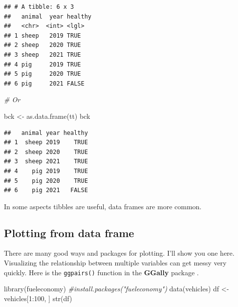 \documentclass[
]{book}
\newenvironment{Shaded}{\begin{snugshade}}{\end{snugshade}}
\newcommand{\CommentTok}[1]{\textcolor[rgb]{0.56,0.35,0.01}{\textit{#1}}}
\newcommand{\DecValTok}[1]{\textcolor[rgb]{0.00,0.00,0.81}{#1}}
\newcommand{\FunctionTok}[1]{\textcolor[rgb]{0.00,0.00,0.00}{#1}}
\newcommand{\NormalTok}[1]{#1}
\newcommand{\OtherTok}[1]{\textcolor[rgb]{0.56,0.35,0.01}{#1}}
\newcommand{\SpecialCharTok}[1]{\textcolor[rgb]{0.00,0.00,0.00}{#1}}
\begin{document}
\begin{verbatim}
## # A tibble: 6 x 3
##   animal  year healthy
##   <chr>  <int> <lgl>  
## 1 sheep   2019 TRUE   
## 2 sheep   2020 TRUE   
## 3 sheep   2021 TRUE   
## 4 pig     2019 TRUE   
## 5 pig     2020 TRUE   
## 6 pig     2021 FALSE
\end{verbatim}

\begin{Shaded}
\begin{Highlighting}[]
\CommentTok{\# Or}

\NormalTok{bck }\OtherTok{\textless{}{-}} \FunctionTok{as.data.frame}\NormalTok{(tt)}
\NormalTok{bck}
\end{Highlighting}
\end{Shaded}

\begin{verbatim}
##   animal year healthy
## 1  sheep 2019    TRUE
## 2  sheep 2020    TRUE
## 3  sheep 2021    TRUE
## 4    pig 2019    TRUE
## 5    pig 2020    TRUE
## 6    pig 2021   FALSE
\end{verbatim}

In some aspects tibbles are useful, data frames are more common.

\hypertarget{plotting-from-data-frame}{%
\subsection{Plotting from data frame}\label{plotting-from-data-frame}}

There are many good ways and packages for plotting. I'll show you one here. Visualizing the relationship between multiple variables can get messy very quickly. Here is the \texttt{ggpairs()} function in the \textbf{GGally} package \citep{Tay_2019}.

\begin{Shaded}
\begin{Highlighting}[]
\FunctionTok{library}\NormalTok{(fueleconomy)  }\CommentTok{\#install.packages("fueleconomy")}
\FunctionTok{data}\NormalTok{(vehicles)}
\NormalTok{df }\OtherTok{\textless{}{-}}\NormalTok{ vehicles[}\DecValTok{1}\SpecialCharTok{:}\DecValTok{100}\NormalTok{, ]}
\FunctionTok{str}\NormalTok{(df)}
\end{Highlighting}
\end{Shaded}
\end{document}
